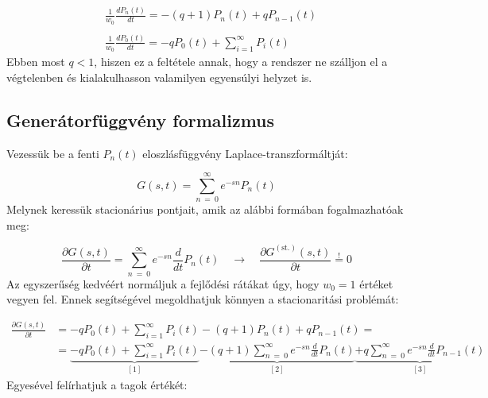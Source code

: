 \begin{align}
    &\frac{1}{w_{0}} \frac{d P_{n} \left( t \right)}{d t}
    =
    - \left( q + 1 \right) P_{n} \left( t \right) + q P_{n-1} \left( t \right)
    \\ \nonumber \\
    &\frac{1}{w_{0}} \frac{d P_{0} \left( t \right)}{d t}
    =
    - q P_{0} \left( t \right)
    +
    \sum_{i=1}^{\infty} P_{i} \left( t \right)
\end{align}
Ebben most $q < 1$, hiszen ez a feltétele annak, hogy a rendszer ne szálljon el a végtelenben és kialakulhasson valamilyen egyensúlyi helyzet is.

\subsection{Generátorfüggvény formalizmus}
Vezessük be a fenti $P_{n} \left( t \right)$ eloszlásfüggvény Laplace-transzformáltját:

\begin{equation}
    G \left( s, t \right)
    =
    \sum_{n\ =\ 0}^{\infty} e^{-sn} P_{n} \left( t \right)
\end{equation}
Melynek keressük stacionárius pontjait, amik az alábbi formában fogalmazhatóak meg:

\begin{equation}
    \frac{\partial G \left( s, t \right)}{\partial t}
    =
    \sum_{n\ =\ 0}^{\infty} e^{-sn} \frac{d}{dt} P_{n} \left( t \right)
    \quad \to \quad
    \frac{\partial G^{\left( \text{st.} \right)} \left( s, t \right)}{\partial t}
    \overset{!}{=}
    0
\end{equation}
Az egyszerűség kedvéért normáljuk a fejlődési rátákat úgy, hogy $w_{0} = 1$ értéket vegyen fel. Ennek segítségével megoldhatjuk könnyen a stacionaritási problémát:

\begin{align}
    \frac{\partial G \left( s, t \right)}{\partial t}
    &=
    - q P_{0} \left( t \right)
    +
    \sum_{i=1}^{\infty} P_{i} \left( t \right)
    -
    \left( q + 1 \right) P_{n} \left( t \right) + q P_{n-1} \left( t \right)
    = \nonumber \\
    &=
    \underbrace{- q P_{0} \left( t \right)
    +
    \sum_{i=1}^{\infty} P_{i} \left( t \right)}_{[1]}
    \underbrace{
    -
    \left( q + 1 \right)\sum_{n\ =\ 0}^{\infty} e^{-sn} \frac{d}{dt} P_{n} \left( t \right)}_{[2]}
    \underbrace{
    +
    q \sum_{n\ =\ 0}^{\infty} e^{-sn} \frac{d}{dt} P_{n-1} \left( t \right)}_{[3]}
\end{align}
Egyesével felírhatjuk a tagok értékét:

